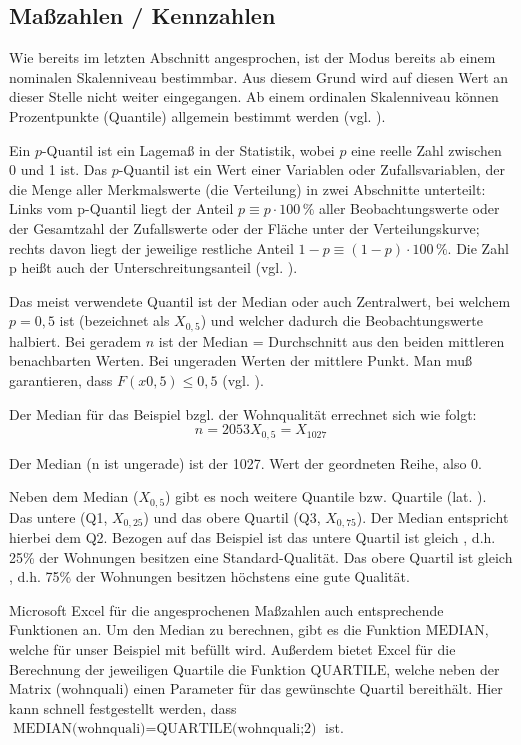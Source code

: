 \subsection{Maßzahlen / Kennzahlen}
Wie bereits im letzten Abschnitt angesprochen, ist der Modus bereits ab einem nominalen Skalenniveau
bestimmbar. Aus diesem Grund wird auf diesen Wert an dieser Stelle nicht weiter eingegangen. Ab einem
ordinalen Skalenniveau können Prozentpunkte (Quantile) allgemein bestimmt werden (vgl. ). 

Ein $p$-Quantil ist ein Lagemaß in der Statistik, wobei $p$ eine reelle Zahl zwischen 0 und 1 ist. 
Das $p$-Quantil ist ein Wert einer Variablen oder Zufallsvariablen, der die Menge aller Merkmalswerte (die Verteilung) in zwei Abschnitte unterteilt: 
Links vom p-Quantil liegt der Anteil $p \equiv p \cdot 100\,\%$ aller Beobachtungswerte oder der Gesamtzahl der Zufallswerte oder der Fläche unter der Verteilungskurve; 
rechts davon liegt der jeweilige restliche Anteil $1-p \equiv (1-p) \cdot 100\,\%$. Die Zahl p heißt auch der Unterschreitungsanteil (vgl. ).

Das meist verwendete Quantil ist der Median oder auch Zentralwert, bei welchem $p=0,5$ ist (bezeichnet als $X_{0,5}$) und 
welcher dadurch die Beobachtungswerte halbiert. Bei geradem $n$ ist der Median = Durchschnitt aus den beiden mittleren benachbarten Werten. 
Bei ungeraden Werten der mittlere Punkt. Man muß garantieren, dass $F(x0,5) \leq 0,5$ (vgl. ).

Der Median für das Beispiel bzgl. der Wohnqualität errechnet sich wie folgt:
\[
	n=2053
	X_{0,5}=X_{1027}
\]

Der Median (n ist ungerade) ist der 1027. Wert der geordneten Reihe, also $0$. 

Neben dem Median ($X_{0,5}$) gibt es noch weitere Quantile bzw. Quartile (lat. ). Das untere (Q1, $X_{0,25}$) und das obere Quartil (Q3, $X_{0,75}$).
Der Median entspricht hierbei dem Q2. Bezogen auf das Beispiel ist das untere Quartil ist gleich , d.h. 25\% der Wohnungen besitzen eine Standard-Qualität. Das obere Quartil ist gleich , d.h. 
75\% der Wohnungen besitzen höchstens eine gute Qualität.

Microsoft Excel für die angesprochenen Maßzahlen auch entsprechende Funktionen an. 
Um den Median zu berechnen, gibt es die Funktion $\text{MEDIAN}$, welche für unser Beispiel mit  befüllt wird. 
Außerdem bietet Excel für die Berechnung der jeweiligen Quartile die Funktion $\text{QUARTILE}$, welche neben der Matrix (wohnquali) einen Parameter
für das gewünschte Quartil bereithält. Hier kann schnell festgestellt werden, dass $\text{MEDIAN(wohnquali)}=\text{QUARTILE(wohnquali;2)}$ ist. 